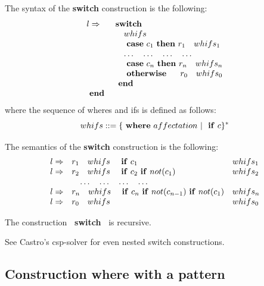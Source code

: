 \documentclass{article}
\begin{document}
{\scriptsize
The syntax of the {\bf switch} construction is the following:
\[\begin{array}{ll}
 l \Rightarrow & {\bf switch~} \\
            & \quad whifs \\
            & \quad {\bf ~case~} c_1 {\bf ~then~} r_1 \quad whifs_1 \\
            & \quad \dots \quad \dots \quad \dots \quad \dots\\
            & \quad {\bf ~case~} c_n {\bf ~then~} r_n \quad whifs_n \\
            & \quad {\bf ~otherwise~}  \quad ~r_0 \quad whifs_0 \\
            & {\bf ~end~} \\
 {\bf ~end~}
\end{array}\]
where the sequence of wheres and ifs is defined as follows:
\[
 whifs     ::= \{ {\bf ~where~} affectation  ~|~ {\bf ~if~} c \}^{*}
\]

\noindent
The semantics of the {\bf switch} construction is the following:
\[\begin{array}{lll}
  l \Rightarrow & r_1 \quad whifs \quad {\bf ~if~} c_1 & whifs_1 \\
  l \Rightarrow & r_2 \quad whifs \quad {\bf ~if~} c_2 {\bf ~if~} not(c_1) & whifs_2 \\
            & \quad \dots \quad \dots \quad \dots \quad \dots\\
  l \Rightarrow & r_n \quad whifs \quad {\bf ~if~} c_n {\bf ~if~} not(c_{n-1}) {\bf ~if~} not(c_1) 
                         & whifs_n\\
  l \Rightarrow & r_0 \quad whifs &  whifs_0\\
\end{array}\]

\noindent
The construction {\bf ~switch~} is recursive.

See Castro's csp-solver for even nested switch constructions.
}

\subsection{Construction where with a pattern}
\end{document}
